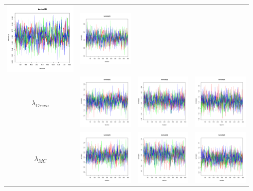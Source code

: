 \documentclass[letter,12pt]{article}
\begin{document}
\begin{table}
\begin{tabular}{cccc}
                        \includegraphics[width=.15\columnwidth]{../graphs/traceplots/2003d97vbar_3.pdf} &
                         \includegraphics[width=.15\columnwidth]{../graphs/traceplots/2003d97wbar_3.pdf} \\
    $\lambda_{Green}$  & \includegraphics[width=.15\columnwidth]{../graphs/traceplots/2003d97v_4.pdf} &
                        \includegraphics[width=.15\columnwidth]{../graphs/traceplots/2003d97vbar_4.pdf} &
                         \includegraphics[width=.15\columnwidth]{../graphs/traceplots/2003d97wbar_4.pdf} \\
    $\lambda_{MC}$    & \includegraphics[width=.15\columnwidth]{../graphs/traceplots/2003d97v_5.pdf} &
                        \includegraphics[width=.15\columnwidth]{../graphs/traceplots/2003d97vbar_5.pdf} &
                         \includegraphics[width=.15\columnwidth]{../graphs/traceplots/2003d97wbar_5.pdf} \\

\end{tabular}
\end{table}
\end{document}
